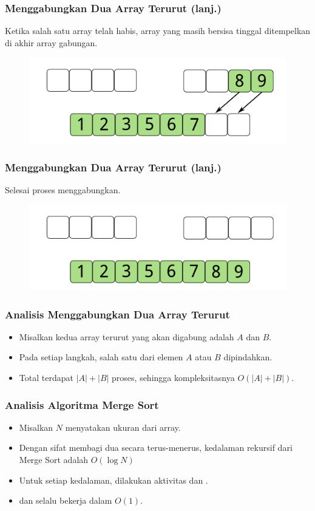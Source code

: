 \begin{frame}
\frametitle{Menggabungkan Dua Array Terurut (lanj.)}
Ketika salah satu array telah habis, array yang masih bersisa tinggal ditempelkan di akhir array gabungan.
\begin{figure}
  \centering
  \includegraphics[width=10 cm]{asset/merge-array-pair-8.pdf}
\end{figure}
\end{frame}

\begin{frame}
\frametitle{Menggabungkan Dua Array Terurut (lanj.)}
Selesai proses menggabungkan.
\begin{figure}
  \centering
  \includegraphics[width=10 cm]{asset/merge-array-pair-9.pdf}
\end{figure}
\end{frame}

\begin{frame}
\frametitle{Analisis Menggabungkan Dua Array Terurut}
\begin{itemize}
  \item Misalkan kedua array terurut yang akan digabung adalah $A$ dan $B$.
  \item Pada setiap langkah, salah satu dari elemen $A$ atau $B$ dipindahkan.
  \item Total terdapat $|A| + |B|$ proses, sehingga kompleksitasnya $O(|A| + |B|)$.
\end{itemize}
\end{frame}

\begin{frame}
\frametitle{Analisis Algoritma Merge Sort}
\begin{itemize}
  \item Misalkan $N$ menyatakan ukuran dari array.
  \item Dengan sifat membagi dua secara terus-menerus, kedalaman rekursif dari Merge Sort adalah $O(\log{N})$
  \item Untuk setiap kedalaman, dilakukan aktivitas  dan .
  \item {} dan  selalu bekerja dalam $O(1)$.
\end{itemize}
\end{frame}

